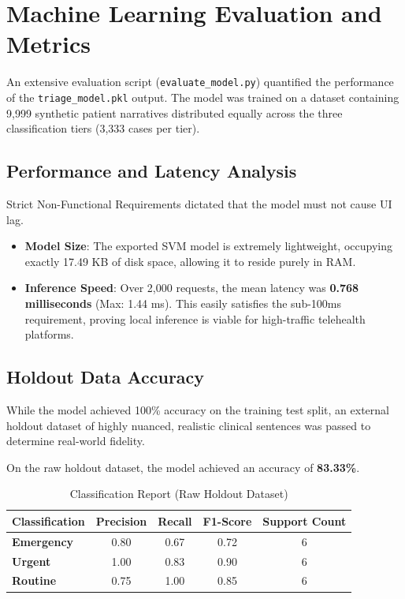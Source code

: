 \documentclass[12pt,a4paper]{report}
\begin{document}
\section{Machine Learning Evaluation and Metrics}
An extensive evaluation script (\texttt{evaluate\_model.py}) quantified the performance of the \texttt{triage\_model.pkl} output. The model was trained on a dataset containing 9,999 synthetic patient narratives distributed equally across the three classification tiers (3,333 cases per tier).

\subsection{Performance and Latency Analysis}
Strict Non-Functional Requirements dictated that the model must not cause UI lag.
\begin{itemize}
    \item \textbf{Model Size}: The exported SVM model is extremely lightweight, occupying exactly 17.49 KB of disk space, allowing it to reside purely in RAM.
    \item \textbf{Inference Speed}: Over 2,000 requests, the mean latency was \textbf{0.768 milliseconds} (Max: 1.44 ms). This easily satisfies the sub-100ms requirement, proving local inference is viable for high-traffic telehealth platforms.
\end{itemize}

\subsection{Holdout Data Accuracy}
While the model achieved 100\% accuracy on the training test split, an external holdout dataset of highly nuanced, realistic clinical sentences was passed to determine real-world fidelity.

On the raw holdout dataset, the model achieved an accuracy of \textbf{83.33\%}.

\begin{table}[H]
\centering
\caption{Classification Report (Raw Holdout Dataset)}
\begin{tabular}{|l|c|c|c|c|}
\hline
\textbf{Classification} & \textbf{Precision} & \textbf{Recall} & \textbf{F1-Score} & \textbf{Support Count} \\ \hline
\textbf{Emergency} & 0.80 & 0.67 & 0.72 & 6 \\ \hline
\textbf{Urgent} & 1.00 & 0.83 & 0.90 & 6 \\ \hline
\textbf{Routine} & 0.75 & 1.00 & 0.85 & 6 \\ \hline
\end{tabular}
\end{table}
\end{document}
